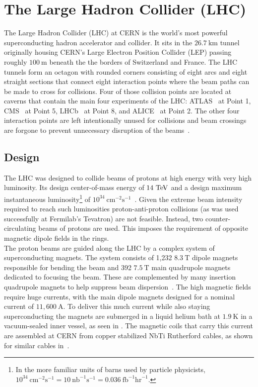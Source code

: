 \chapter{The Large Hadron Collider (LHC)}\label{chapter:LHC}

The Large Hadron Collider (\Gls{LHC}) at CERN is the world's most powerful superconducting hadron accelerator and collider.
It sits in the $26.7~\mathrm{km}$ tunnel originally housing CERN's Large Electron Position Collider (LEP) passing roughly $100~\mathrm{m}$ beneath the the borders of Switzerland and France.
The LHC tunnels form an octagon with rounded corners consisting of eight arcs and eight straight sections that connect eight \glspl{interaction point} where the beam paths can be made to cross for collisions.
Four of those collision points are located at caverns that contain the main four experiments of the LHC: ATLAS~\cite{PERF-2007-01} at Point 1, CMS~\cite{CMS:2008} at Point 5, LHCb~\cite{LHCb:2008} at Point 8, and ALICE~\cite{ALICE:2008} at Point 2.
The other four interaction points are left intentionally unused for collisions and beam crossings are forgone to prevent unnecessary disruption of the beams~\cite{Evans:2008}.

\section{Design}

The LHC was designed to collide beams of protons at high energy with very high luminosity.
Its design center-of-mass energy of $14~\mathrm{TeV}{}$ and a design maximum instantaneous luminosity\footnote{In the more familiar units of barns used by particle physicists, $10^{34}~\mathrm{cm}^{-2}\mathrm{s}^{-1}=10~\mathrm{nb}^{-1}\mathrm{s}^{-1}=0.036~\mathrm{fb}^{-1}\mathrm{hr}^{-1}$.} of $10^{34}~\mathrm{cm}^{-2}\mathrm{s}^{-1}$~\cite{Bruning:782076,Evans:2008}.
Given the extreme beam intensity required to reach such luminosities proton-anti-proton collisions (as was used successfully at Fermilab's Tevatron) are not feasible.
Instead, two counter-circulating beams of protons are used.
This imposes the requirement of opposite magnetic dipole fields in the rings.\\

The proton beams are guided along the LHC by a complex system of superconducting magnets.
The system consists of 1,232 $8.3~\mathrm{T}$ dipole magnets responsible for bending the beam and 392 $7.5~\mathrm{T}$ main quadrupole magnets dedicated to focusing the beam.
These are complemented by many insertion quadrupole magnets to help suppress beam dispersion~\cite{Rossi:2003,Rossi:2004}.
The high magnetic fields require huge currents, with the main dipole magnets designed for a nominal current of $11,600~\mathrm{A}$.
To deliver this much current while also staying superconducting the magnets are submerged in a liquid helium bath at $1.9~\mathrm{K}$ in a vacuum-sealed inner vessel, as seen in .
The magnetic coils that carry this current are assembled at CERN from copper stabilized NbTi Rutherford cables, as shown for similar cables in~\cite{CERN-FOOTAGE-2016-014-001}.

